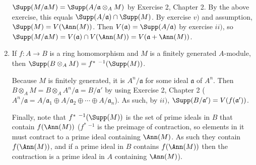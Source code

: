 \begin{questions}
\begin{enumerate}
	\begin{solution}
		$\Supp(M / \mathfrak{a}M) = \Supp(A / \mathfrak{a} \otimes_A M) $ by Exercise 2, Chapter 2.
		By the above exercise, this equals $\Supp(A / \mathfrak{a}) \cap \Supp(M) $.
		By exercise $v) $ and assumption, $\Supp(M) = V(\Ann(M)) $.
		Then $V(\mathfrak{a}) = \Supp(A / \mathfrak{a}) $ by exercise $ii) $, so $\Supp(M / \mathfrak{a}M) = V(\mathfrak{a}) \cap V(\Ann(M)) = V(\mathfrak{a} + \Ann(M)) $.
	\end{solution}
	\item If $f: A\to B $ is a ring homomorphism and $M $ is a finitely generated $A $-module, then $\Supp(B \otimes _A M) = f^\ast\ ^{-1}(\Supp(M))$.
	\begin{solution}
		Because $M $ is finitely generated, it is $A^n / \mathfrak{a} $ for some ideal $\mathfrak{a} $ of $A^n $.
		Then $B \otimes _A M = B \otimes _A A^n / \mathfrak{a} = B / \mathfrak{a}' $ by using Exercise 2, Chapter 2 ($A^n / \mathfrak{a} = A / \mathfrak{a}_1 \oplus A / \mathfrak{a}_2 \oplus \cdots \oplus A / \mathfrak{a}_n$).
		As such, by $ii) $, $\Supp(B / \mathfrak{a}') = V(f(\mathfrak{a}'))$.

		Finally, note that $f^\ast\ ^{-1}(\Supp(M)) $ is the set of prime ideals in $B $ that contain $f(\Ann(M)) $ ($f^\ast\ ^{-1} $ is the preimage of contraction, so elements in it must contract to a prime ideal containing $\Ann(M) $.
		As such they contain $f(\Ann(M)) $, and if a prime ideal in $B $ contains $f(\Ann(M)) $ then the contraction is a prime ideal in $A $ containing $\Ann(M) $).
	\end{solution}
\end{enumerate}


\end{questions}
